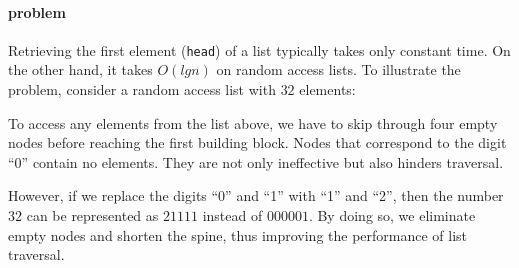 \documentclass[\main/thesis.tex]{subfiles}
\begin{document}
\paragraph{problem}

Retrieving the first element ({\lstinline|head|}) of a list typically takes
only constant time. On the other hand, it takes $ O(lg n) $ on random access lists.
To illustrate the problem, consider a random access list with $ 32 $ elements:

\begin{center}
\end{center}

To access any elements from the list above, we have to skip
through four empty nodes before reaching the first building block.
Nodes that correspond to the digit ``0'' contain no elements.
They are not only ineffective but also hinders traversal.

However, if we replace the digits ``0'' and ``1'' with ``1'' and ``2'',
then the number $ 32 $ can be represented as $ 21111 $ instead of $ 000001 $.
By doing so, we eliminate empty nodes and shorten the spine, thus improving
the performance of list traversal.
\end{document}
